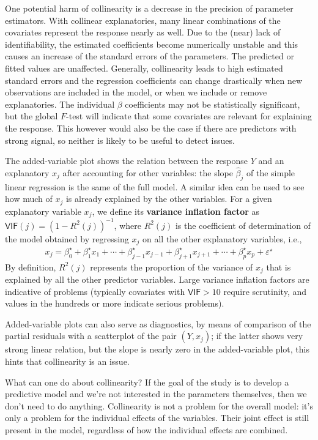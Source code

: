 \documentclass[
  11pt,
  letterpaper,
]{scrbook}
\theoremstyle{definition}
\theoremstyle{definition}
\theoremstyle{plain}
\theoremstyle{plain}
\theoremstyle{remark}
\begin{document}
One potential harm of collinearity is a decrease in the precision of
parameter estimators. With collinear explanatories, many linear
combinations of the covariates represent the response nearly as well.
Due to the (near) lack of identifiability, the estimated coefficients
become numerically unstable and this causes an increase of the standard
errors of the parameters. The predicted or fitted values are unaffected.
Generally, collinearity leads to high estimated standard errors and the
regression coefficients can change drastically when new observations are
included in the model, or when we include or remove explanatories. The
individual \(\beta\) coefficients may not be statistically significant,
but the global \(F\)-test will indicate that some covariates are
relevant for explaining the response. This however would also be the
case if there are predictors with strong signal, so neither is likely to
be useful to detect issues.

The added-variable plot shows the relation between the response \(Y\)
and an explanatory \(x_j\) after accounting for other variables: the
slope \(\widehat{\beta}_j\) of the simple linear regression is the same
of the full model. A similar idea can be used to see how much of \(x_j\)
is already explained by the other variables. For a given explanatory
variable \(x_j\), we define its \textbf{variance inflation factor} as
\(\mathsf{VIF}(j)=(1-R^2(j))^{-1}\), where \(R^2(j)\) is the coefficient
of determination of the model obtained by regressing \(x_j\) on all the
other explanatory variables, i.e., \begin{align*}
x_j = \beta^{\star}_0 + \beta^{\star}_1 x_1 + \cdots + \beta^{\star}_{j-1} x_{j-1} + \beta^{\star}_{j+1} x_{j+1} + \cdots + \beta^{\star}_px_p + \varepsilon^{\star}
\end{align*} By definition, \(R^2(j)\) represents the proportion of the
variance of \(x_j\) that is explained by all the other predictor
variables. Large variance inflation factors are indicative of problems
(typically covariates with \(\mathsf{VIF}>10\) require scrutinity, and
values in the hundreds or more indicate serious problems).

Added-variable plots can also serve as diagnostics, by means of
comparison of the partial residuals with a scatterplot of the pair
\((Y, x_j)\); if the latter shows very strong linear relation, but the
slope is nearly zero in the added-variable plot, this hints that
collinearity is an issue.

What can one do about collinearity? If the goal of the study is to
develop a predictive model and we're not interested in the parameters
themselves, then we don't need to do anything. Collinearity is not a
problem for the overall model: it's only a problem for the individual
effects of the variables. Their joint effect is still present in the
model, regardless of how the individual effects are combined.
\end{document}
